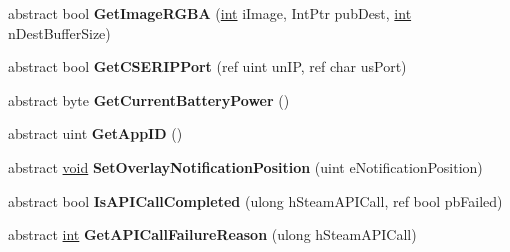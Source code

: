 \begin{DoxyCompactItemize}
\item 
\hypertarget{classValve_1_1Steamworks_1_1ISteamUtils_ac3ee90f8e3f44238a060c3be91c64284}{}abstract bool {\bfseries Get\+Image\+R\+G\+B\+A} (\hyperlink{SDL__thread_8h_a6a64f9be4433e4de6e2f2f548cf3c08e}{int} i\+Image, Int\+Ptr pub\+Dest, \hyperlink{SDL__thread_8h_a6a64f9be4433e4de6e2f2f548cf3c08e}{int} n\+Dest\+Buffer\+Size)\label{classValve_1_1Steamworks_1_1ISteamUtils_ac3ee90f8e3f44238a060c3be91c64284}

\item 
\hypertarget{classValve_1_1Steamworks_1_1ISteamUtils_af176d07f593cf3279ce8f546d0726e95}{}abstract bool {\bfseries Get\+C\+S\+E\+R\+I\+P\+Port} (ref uint un\+I\+P, ref char us\+Port)\label{classValve_1_1Steamworks_1_1ISteamUtils_af176d07f593cf3279ce8f546d0726e95}

\item 
\hypertarget{classValve_1_1Steamworks_1_1ISteamUtils_aa4592fdb0ba3d483f8e83d9bc976964b}{}abstract byte {\bfseries Get\+Current\+Battery\+Power} ()\label{classValve_1_1Steamworks_1_1ISteamUtils_aa4592fdb0ba3d483f8e83d9bc976964b}

\item 
\hypertarget{classValve_1_1Steamworks_1_1ISteamUtils_a6d56e5412e76a8c26dcbccc9b527c0a4}{}abstract uint {\bfseries Get\+App\+I\+D} ()\label{classValve_1_1Steamworks_1_1ISteamUtils_a6d56e5412e76a8c26dcbccc9b527c0a4}

\item 
\hypertarget{classValve_1_1Steamworks_1_1ISteamUtils_aed9d076878fc4d52b3c444fe1162fd38}{}abstract \hyperlink{SDL__audio_8h_a52835ae37c4bb905b903cbaf5d04b05f}{void} {\bfseries Set\+Overlay\+Notification\+Position} (uint e\+Notification\+Position)\label{classValve_1_1Steamworks_1_1ISteamUtils_aed9d076878fc4d52b3c444fe1162fd38}

\item 
\hypertarget{classValve_1_1Steamworks_1_1ISteamUtils_aa2c69fd8ab2b8a01a418c095380ff183}{}abstract bool {\bfseries Is\+A\+P\+I\+Call\+Completed} (ulong h\+Steam\+A\+P\+I\+Call, ref bool pb\+Failed)\label{classValve_1_1Steamworks_1_1ISteamUtils_aa2c69fd8ab2b8a01a418c095380ff183}

\item 
\hypertarget{classValve_1_1Steamworks_1_1ISteamUtils_aa7c77c944c337188fd17b9dc8ed0602b}{}abstract \hyperlink{SDL__thread_8h_a6a64f9be4433e4de6e2f2f548cf3c08e}{int} {\bfseries Get\+A\+P\+I\+Call\+Failure\+Reason} (ulong h\+Steam\+A\+P\+I\+Call)\label{classValve_1_1Steamworks_1_1ISteamUtils_aa7c77c944c337188fd17b9dc8ed0602b}


\end{DoxyCompactItemize}
